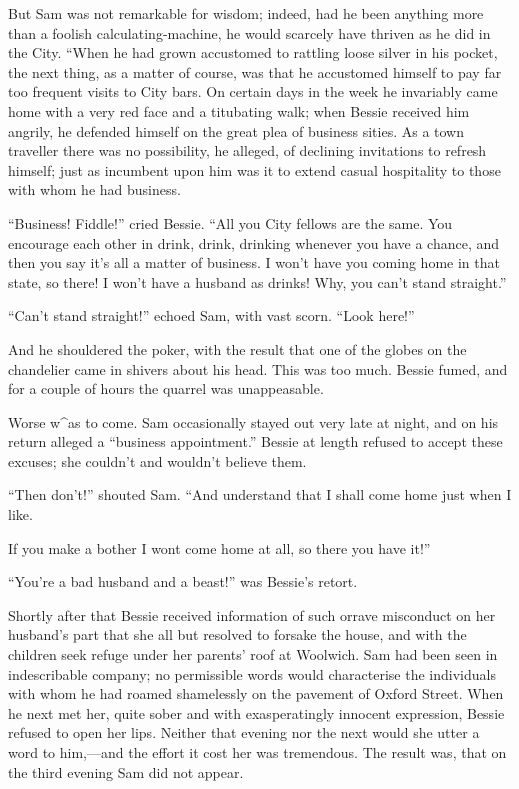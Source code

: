 But Sam was not remarkable for wisdom; indeed, had he been anything more
than a foolish calculating-machine, he would scarcely have thriven as he
did in the City. ``When he had grown accustomed to rattling loose silver
in his pocket, the next thing, as a matter of course, was that he
accustomed himself to pay far too frequent visits to City bars. On
certain days in the week he invariably came home with a very red face
and a titubating walk; when Bessie received him angrily, he defended
himself on the great plea of business {}sities. As a town traveller
there was no possibility, he alleged, of declining invitations to
refresh himself; just as incumbent upon him was it to extend casual
hospitality to those with whom he had business.

``Business! Fiddle!'' cried Bessie. ``All you City fellows are the same.
You encourage each other in drink, drink, drinking whenever you have a
chance, and then you say it's all a matter of business. I won't have you
coming home in that state, so there! I won't have a husband as drinks!
Why, you can't stand straight.''

``Can't stand straight!'' echoed Sam, with vast scorn. ``Look here!''

And he shouldered the poker, with the result that one of the globes on
the chandelier came in shivers about his head. This was too much. Bessie
fumed, and for a couple of hours the quarrel was unappeasable.

Worse w\^{}as to come. Sam occasionally stayed out very late at night,
and on his return alleged a ``business appointment.'' Bessie at length
refused to accept these excuses; she couldn't and wouldn't believe them.

``Then don't!'' shouted Sam. ``And understand that I shall come home
just when I like.

{}If you make a bother I wont come home at all, so there you have it!''

``You're a bad husband and a beast!'' was Bessie's retort.

Shortly after that Bessie received information of such orrave misconduct
on her husband's part that she all but resolved to forsake the house,
and with the children seek refuge under her parents' roof at Woolwich.
Sam had been seen in indescribable company; no permissible words would
characterise the individuals with whom he had roamed shamelessly on the
pavement of Oxford Street. When he next met her, quite sober and with
exasperatingly innocent expression, Bessie refused to open her lips.
Neither that evening nor the next would she utter a word to him,---and
the effort it cost her was tremendous. The result was, that on the third
evening Sam did not appear.

